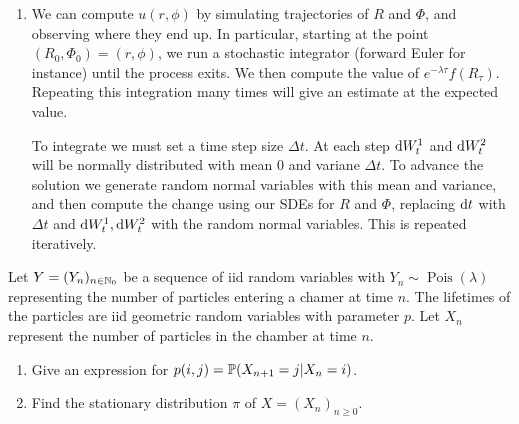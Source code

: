 \begin{solution}[Solution]
\begin{enumerate}[label=(\alph*)]
    \item We can compute \( u(r,\phi) \) by simulating trajectories of \( R \) and \( \Phi \), and observing where they end up. In particular, starting at the point \( (R_0,\Phi_0) = (r,\phi) \), we run a stochastic integrator (forward Euler for instance) until the process exits. We then compute the value of \( e^{-\lambda \tau} f(R_\tau) \). Repeating this integration many times will give an estimate at the expected value.

        To integrate we must set a time step size \( \Delta t \). At each step \( \mathrm{d} W_t^1 \) and \( \mathrm{d} W_t^2 \) will be normally distributed with mean 0 and variane \( \Delta t \). To advance the solution we generate random normal variables with this mean and variance, and then compute the change using our SDEs for \( R \) and \( \Phi \), replacing \( \mathrm{d} t \) with \( \Delta t \) and \( \mathrm{d} W_t^1, \mathrm{d} W_t^2 \) with the random normal variables. This is repeated iteratively.

\end{enumerate}
\end{solution}


\begin{problem}
Let \( Y = (Y_n)_{n\in\mathbb{N}_0} \) be a sequence of iid random variables with \( Y_n\sim \operatorname{Pois}(\lambda) \) representing the number of particles entering a chamer at time \( n \). The lifetimes of the particles are iid geometric random variables with parameter \( p \). Let \( X_n \) represent the number of particles in the chamber at time \( n \).
\begin{enumerate}[nolistsep,label=(\alph*)]
    \item Give an expression for \( p(i,j) = \mathbb{P}(X_{n+1} = j | X_n = i) \).
    \item Find the stationary distribution \( \pi \) of \( X = (X_n)_{n\geq 0} \).
\end{enumerate}
\end{problem}

